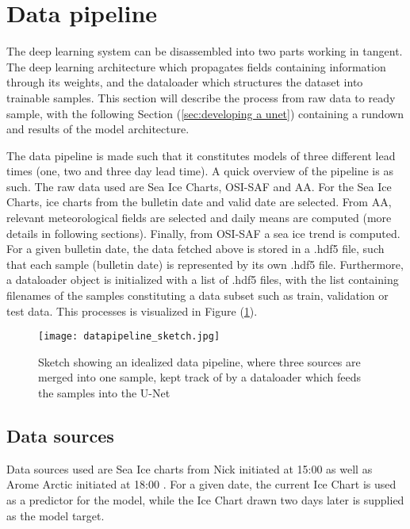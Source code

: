 \documentclass[../main/thesis.tex]{subfiles}
\begin{document}
\section{Data pipeline}
The deep learning system can be disassembled into two parts working in tangent. The deep learning architecture which propagates fields containing information through its weights, and the dataloader which structures the dataset into trainable samples. This section will describe the process from raw data to ready sample, with the following Section (\ref{sec:developing a unet}) containing a rundown and results of the model architecture.

The data pipeline is made such that it constitutes models of three different lead times (one, two and three day lead time). A quick overview of the pipeline is as such. The raw data used are Sea Ice Charts, OSI-SAF and AA. For the Sea Ice Charts, ice charts from the bulletin date and valid date are selected. From AA, relevant meteorological fields are selected and daily means are computed (more details in following sections). Finally, from OSI-SAF a sea ice trend is computed. For a given bulletin date, the data fetched above is stored in a .hdf5 file, such that each sample (bulletin date) is represented by its own .hdf5 file. Furthermore, a dataloader object is initialized with a list of .hdf5 files, with the list containing filenames of the samples constituting a data subset such as train, validation or test data. This processes is visualized in Figure (\ref{fig:pipeline_sketch}).

\begin{figure}
    \texttt{[image: datapipeline\_sketch.jpg]}
    \caption{\label{fig:pipeline_sketch}Sketch showing an idealized data pipeline, where three sources are merged into one sample, kept track of by a dataloader which feeds the samples into the U-Net}
\end{figure}


\subsection{Data sources}
Data sources used are Sea Ice charts from Nick initiated at 15:00 as well as Arome Arctic initiated at 18:00 \cite{MOI2015,Mueller2017}. For a given date, the current Ice Chart is used as a predictor for the model, while the Ice Chart drawn two days later is supplied as the model target.
\end{document}

